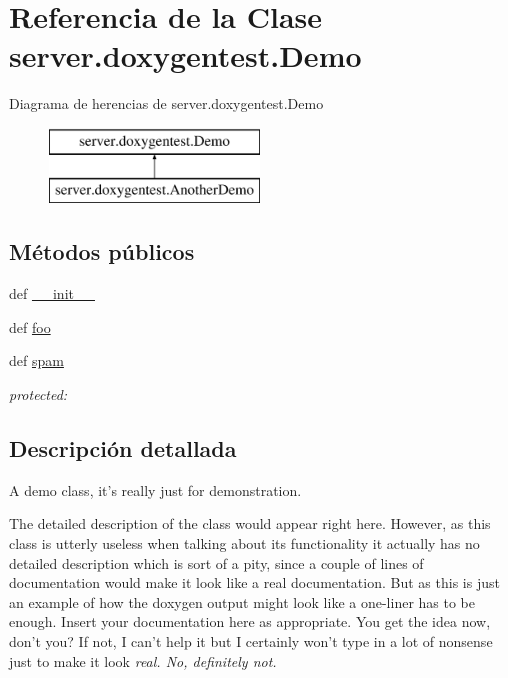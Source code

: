 \hypertarget{classserver_1_1doxygentest_1_1_demo}{\section{Referencia de la Clase server.\-doxygentest.\-Demo}
\label{classserver_1_1doxygentest_1_1_demo}
}
Diagrama de herencias de server.\-doxygentest.\-Demo\begin{figure}[H]
\begin{center}
\leavevmode
\includegraphics[height=2.000000cm]{classserver_1_1doxygentest_1_1_demo}
\end{center}
\end{figure}
\subsection*{Métodos públicos}
\begin{DoxyCompactItemize}
\item 
def \hyperlink{classserver_1_1doxygentest_1_1_demo_a5b398023230dee4667b322f95086aed7}{\-\_\-\-\_\-init\-\_\-\-\_\-}
\item 
def \hyperlink{classserver_1_1doxygentest_1_1_demo_a746219bba82e9e2d38b015448776f4b5}{foo}
\item 
def \hyperlink{classserver_1_1doxygentest_1_1_demo_afd773906bc6d63b962b58ea4b51d142a}{spam}
\begin{DoxyCompactList}\small\item\em protected\-: \end{DoxyCompactList}\end{DoxyCompactItemize}


\subsection{Descripción detallada}
\begin{DoxyVerb}\brief A demo class, it's really just for demonstration.

The detailed description of the class would appear right here.
However, as this class is utterly useless when talking about its
functionality it actually has no detailed description which is
sort of a pity, since a couple of lines of documentation would
make it look like a real documentation. But as this is just an
example of how the doxygen output might look like a one-liner has
to be enough. Insert your documentation here as appropriate. You
get the idea now, don't you? If not, I can't help it but I
certainly won't type in a lot of nonsense just to make it look \em
real.  No, definitely not.
\end{DoxyVerb}
 

